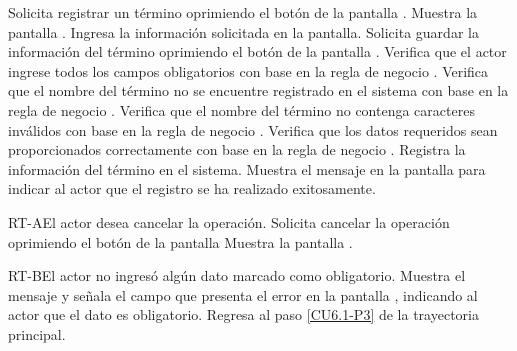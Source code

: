 	\begin{UCtrayectoria}
		\UCpaso[\UCactor] Solicita registrar un término oprimiendo el botón  de la pantalla .
		\UCpaso[\UCsist] Muestra la pantalla .
		\UCpaso[\UCactor] Ingresa la información solicitada en la pantalla. \label{CU6.1-P3}
		\UCpaso[\UCactor] Solicita guardar la información del término oprimiendo el botón  de la pantalla . 
		\UCpaso[\UCsist] Verifica que el actor ingrese todos los campos obligatorios con base en la regla de negocio . 
		\UCpaso[\UCsist] Verifica que el nombre del término no se encuentre registrado en el sistema con base en la regla de negocio . 
		\UCpaso[\UCsist] Verifica que el nombre del término no contenga caracteres inválidos con base en la regla de negocio . 
		\UCpaso[\UCsist] Verifica que los datos requeridos sean proporcionados correctamente con base en la regla de negocio .  
		\UCpaso[\UCsist] Registra la información del término en el sistema.
		\UCpaso[\UCsist] Muestra el mensaje  en la pantalla  para indicar al actor que el registro se ha realizado exitosamente.
	\end{UCtrayectoria}		
	
	\begin{UCtrayectoriaA}{RT-A}{El actor desea cancelar la operación.}
		\UCpaso[\UCactor] Solicita cancelar la operación oprimiendo el botón  de la pantalla 
		\UCpaso[\UCsist] Muestra la pantalla .
	\end{UCtrayectoriaA}

	\begin{UCtrayectoriaA}{RT-B}{El actor no ingresó algún dato marcado como obligatorio.}
		\UCpaso[\UCsist] Muestra el mensaje  y señala el campo que presenta el error en la pantalla , indicando al actor que el dato es obligatorio.
		\UCpaso Regresa al paso \ref{CU6.1-P3} de la trayectoria principal.
	\end{UCtrayectoriaA}
	
